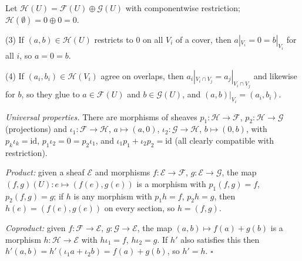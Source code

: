 \documentclass[11pt]{article}
\begin{document}
\pf
Let $\mathcal H(U)=\mathcal F(U)\oplus\mathcal G(U)$ with componentwise restriction; $\mathcal H(\emptyset)=0\oplus0=0$.

(3) If $(a,b)\in\mathcal H(U)$ restricts to $0$ on all $V_i$ of a cover, then $a|_{V_i}=0=b|_{V_i}$ for all $i$, so $a=0=b$.

(4) If $(a_i,b_i)\in\mathcal H(V_i)$ agree on overlaps, then $a_i|_{V_i\cap V_j}=a_j|_{V_i\cap V_j}$ and likewise for $b$, so they glue to $a\in\mathcal F(U)$ and $b\in\mathcal G(U)$, and $(a,b)|_{V_i}=(a_i,b_i)$.

\emph{Universal properties.} There are morphisms of sheaves $p_1\colon\mathcal H\to\mathcal F$, $p_2\colon\mathcal H\to\mathcal G$ (projections) and $\iota_1\colon\mathcal F\to\mathcal H$, $a\mapsto(a,0)$, $\iota_2\colon\mathcal G\to\mathcal H$, $b\mapsto(0,b)$, with $p_k\iota_k=\mathrm{id}$, $p_1\iota_2=0=p_2\iota_1$, and $\iota_1p_1+\iota_2p_2=\mathrm{id}$ (all clearly compatible with restriction).

\emph{Product:} given a sheaf $\mathcal E$ and morphisms $f\colon\mathcal E\to\mathcal F$, $g\colon\mathcal E\to\mathcal G$, the map $(f,g)(U)\colon e\mapsto(f(e),g(e))$ is a morphism with $p_1(f,g)=f$, $p_2(f,g)=g$; if $h$ is any morphism with $p_1h=f$, $p_2h=g$, then $h(e)=(f(e),g(e))$ on every section, so $h=(f,g)$.

\emph{Coproduct:} given $f\colon\mathcal F\to\mathcal E$, $g\colon\mathcal G\to\mathcal E$, the map $(a,b)\mapsto f(a)+g(b)$ is a morphism $h\colon\mathcal H\to\mathcal E$ with $h\iota_1=f$, $h\iota_2=g$. If $h'$ also satisfies this then $h'(a,b)=h'(\iota_1a+\iota_2b)=f(a)+g(b)$, so $h'=h$. \hfill$\square$
\end{document}
